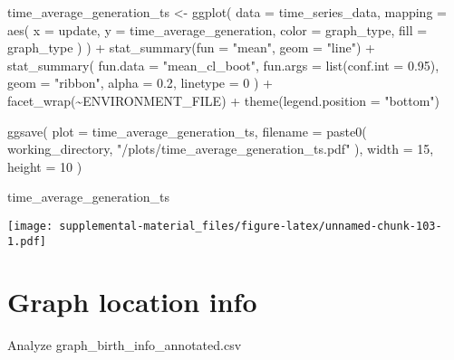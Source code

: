 \documentclass[
]{book}
\newenvironment{Shaded}{\begin{snugshade}}{\end{snugshade}}
\newcommand{\AttributeTok}[1]{\textcolor[rgb]{0.77,0.63,0.00}{#1}}
\newcommand{\DecValTok}[1]{\textcolor[rgb]{0.00,0.00,0.81}{#1}}
\newcommand{\FloatTok}[1]{\textcolor[rgb]{0.00,0.00,0.81}{#1}}
\newcommand{\FunctionTok}[1]{\textcolor[rgb]{0.00,0.00,0.00}{#1}}
\newcommand{\NormalTok}[1]{#1}
\newcommand{\OtherTok}[1]{\textcolor[rgb]{0.56,0.35,0.01}{#1}}
\newcommand{\SpecialCharTok}[1]{\textcolor[rgb]{0.00,0.00,0.00}{#1}}
\newcommand{\StringTok}[1]{\textcolor[rgb]{0.31,0.60,0.02}{#1}}
\begin{document}
\begin{Shaded}
\begin{Highlighting}[]
\NormalTok{time\_average\_generation\_ts }\OtherTok{\textless{}{-}} \FunctionTok{ggplot}\NormalTok{(}
    \AttributeTok{data =}\NormalTok{ time\_series\_data,}
    \AttributeTok{mapping =} \FunctionTok{aes}\NormalTok{(}
      \AttributeTok{x =}\NormalTok{ update,}
      \AttributeTok{y =}\NormalTok{ time\_average\_generation,}
      \AttributeTok{color =}\NormalTok{ graph\_type,}
      \AttributeTok{fill =}\NormalTok{ graph\_type}
\NormalTok{    )}
\NormalTok{  ) }\SpecialCharTok{+}
  \FunctionTok{stat\_summary}\NormalTok{(}\AttributeTok{fun =} \StringTok{"mean"}\NormalTok{, }\AttributeTok{geom =} \StringTok{"line"}\NormalTok{) }\SpecialCharTok{+}
  \FunctionTok{stat\_summary}\NormalTok{(}
    \AttributeTok{fun.data =} \StringTok{"mean\_cl\_boot"}\NormalTok{,}
    \AttributeTok{fun.args =} \FunctionTok{list}\NormalTok{(}\AttributeTok{conf.int =} \FloatTok{0.95}\NormalTok{),}
    \AttributeTok{geom =} \StringTok{"ribbon"}\NormalTok{,}
    \AttributeTok{alpha =} \FloatTok{0.2}\NormalTok{,}
    \AttributeTok{linetype =} \DecValTok{0}
\NormalTok{  ) }\SpecialCharTok{+}
  \FunctionTok{facet\_wrap}\NormalTok{(}\SpecialCharTok{\textasciitilde{}}\NormalTok{ENVIRONMENT\_FILE) }\SpecialCharTok{+}
  \FunctionTok{theme}\NormalTok{(}\AttributeTok{legend.position =} \StringTok{"bottom"}\NormalTok{)}

\FunctionTok{ggsave}\NormalTok{(}
  \AttributeTok{plot =}\NormalTok{ time\_average\_generation\_ts,}
  \AttributeTok{filename =} \FunctionTok{paste0}\NormalTok{(}
\NormalTok{    working\_directory,}
    \StringTok{"/plots/time\_average\_generation\_ts.pdf"}
\NormalTok{  ),}
  \AttributeTok{width =} \DecValTok{15}\NormalTok{,}
  \AttributeTok{height =} \DecValTok{10}
\NormalTok{)}

\NormalTok{time\_average\_generation\_ts}
\end{Highlighting}
\end{Shaded}

\texttt{[image: supplemental-material\_files/figure-latex/unnamed-chunk-103-1.pdf]}

\hypertarget{graph-location-info-1}{%
\section{Graph location info}\label{graph-location-info-1}}

Analyze graph\_birth\_info\_annotated.csv
\end{document}
